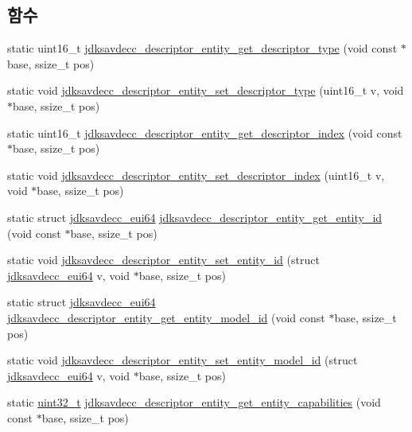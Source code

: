 \subsection*{함수}
\begin{DoxyCompactItemize}
\item 
static uint16\+\_\+t \hyperlink{group__descriptor__entity_gaeef6a94b5953b7190847caa00604ad3f}{jdksavdecc\+\_\+descriptor\+\_\+entity\+\_\+get\+\_\+descriptor\+\_\+type} (void const $\ast$base, ssize\+\_\+t pos)
\item 
static void \hyperlink{group__descriptor__entity_gae44bba0fd8511c6dffafce278c6a4427}{jdksavdecc\+\_\+descriptor\+\_\+entity\+\_\+set\+\_\+descriptor\+\_\+type} (uint16\+\_\+t v, void $\ast$base, ssize\+\_\+t pos)
\item 
static uint16\+\_\+t \hyperlink{group__descriptor__entity_gac3bca390b46a5a293a618196102a6a8e}{jdksavdecc\+\_\+descriptor\+\_\+entity\+\_\+get\+\_\+descriptor\+\_\+index} (void const $\ast$base, ssize\+\_\+t pos)
\item 
static void \hyperlink{group__descriptor__entity_gac6083887de335dc57d31a4c23a395a83}{jdksavdecc\+\_\+descriptor\+\_\+entity\+\_\+set\+\_\+descriptor\+\_\+index} (uint16\+\_\+t v, void $\ast$base, ssize\+\_\+t pos)
\item 
static struct \hyperlink{structjdksavdecc__eui64}{jdksavdecc\+\_\+eui64} \hyperlink{group__descriptor__entity_gaca5b3db8c858e90e061827623fa14c76}{jdksavdecc\+\_\+descriptor\+\_\+entity\+\_\+get\+\_\+entity\+\_\+id} (void const $\ast$base, ssize\+\_\+t pos)
\item 
static void \hyperlink{group__descriptor__entity_gadbd4dde5f37ab2188c7a5ac8693e638f}{jdksavdecc\+\_\+descriptor\+\_\+entity\+\_\+set\+\_\+entity\+\_\+id} (struct \hyperlink{structjdksavdecc__eui64}{jdksavdecc\+\_\+eui64} v, void $\ast$base, ssize\+\_\+t pos)
\item 
static struct \hyperlink{structjdksavdecc__eui64}{jdksavdecc\+\_\+eui64} \hyperlink{group__descriptor__entity_ga384de8652064d5c9e95640a0a30a09ef}{jdksavdecc\+\_\+descriptor\+\_\+entity\+\_\+get\+\_\+entity\+\_\+model\+\_\+id} (void const $\ast$base, ssize\+\_\+t pos)
\item 
static void \hyperlink{group__descriptor__entity_ga69134d2205dee17b6ba7dd87ef1d5a5f}{jdksavdecc\+\_\+descriptor\+\_\+entity\+\_\+set\+\_\+entity\+\_\+model\+\_\+id} (struct \hyperlink{structjdksavdecc__eui64}{jdksavdecc\+\_\+eui64} v, void $\ast$base, ssize\+\_\+t pos)
\item 
static \hyperlink{parse_8c_a6eb1e68cc391dd753bc8ce896dbb8315}{uint32\+\_\+t} \hyperlink{group__descriptor__entity_ga647cba8fff98e97e9b88b2cce47f2864}{jdksavdecc\+\_\+descriptor\+\_\+entity\+\_\+get\+\_\+entity\+\_\+capabilities} (void const $\ast$base, ssize\+\_\+t pos)

\end{DoxyCompactItemize}
